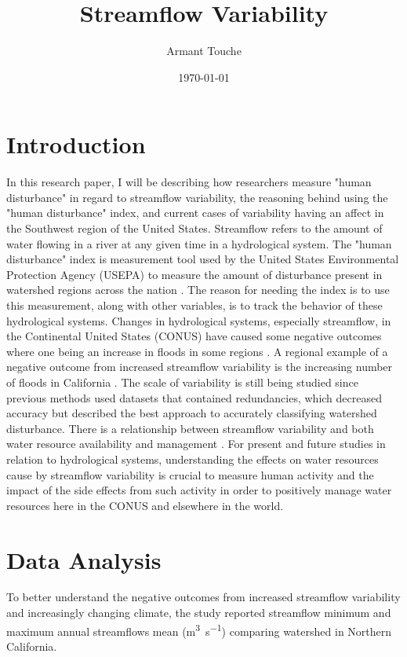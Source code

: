 \documentclass[a4paper,man,biblatex]{apa7}
\title{Streamflow Variability}
\author{Armant Touche}
\affiliation{Portland State University}
\date{\today}
\begin{document}
\maketitle


\section{Introduction} 
\par In this research paper, I will be describing how researchers measure "human disturbance" in regard to streamflow variability, the reasoning behind  using the "human disturbance" index, and current cases of variability having an affect in the Southwest region of the United States. Streamflow refers to the amount of water flowing in a river at any given time \autocite{streamflow_def} in a hydrological system. The "human disturbance" index is measurement tool used by the United States Environmental Protection Agency (USEPA) to measure the amount of disturbance present in watershed regions across the nation \autocite{falcone_2016}. The reason for needing the index is to use this measurement, along with other variables, is to track the behavior of these hydrological systems. Changes in hydrological systems, especially streamflow, in the Continental United States (CONUS) have caused some negative outcomes where one being an increase in floods in some regions \autocite{rice_2016}. A regional example of a negative outcome from increased streamflow variability is the increasing number of floods in California \autocite{standford_2020}. The scale of variability is still being studied since previous methods used datasets that contained redundancies, which decreased accuracy but \textcite{falcone_2016} described the best approach to accurately classifying watershed disturbance. There is a relationship between streamflow variability and both water resource availability and management \autocite{rice_2016}. For present and future studies in relation to hydrological systems, understanding the effects on water resources cause by streamflow variability is crucial to measure human activity and the impact of the side effects from such activity in order to positively manage water resources here in the CONUS and elsewhere in the world.

\section{Data Analysis}  
\par To better understand the negative outcomes from increased streamflow variability and increasingly changing climate, the \textcite{mallakpour_2018} study reported streamflow minimum and maximum annual streamflows mean (\si{\cubic\meter\per\second}) comparing watershed in Northern California.\\ 
\end{document}
